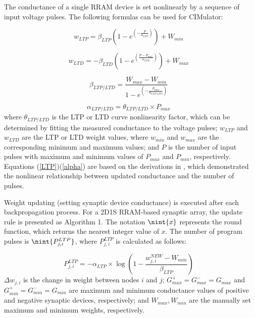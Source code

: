 \documentclass[journal]{IEEEtran}
\DeclarePairedDelimiter{\nint}\lfloor\rceil
\begin{document}
The conductance of a single RRAM device is set nonlinearly by a sequence of input voltage pulses. The following formulas can be used for  CIMulator:

\begin{equation}
w_{LTP}=\beta_{LTP}(1-e^{(-\frac{P}{\alpha_{LTP}})})+W_{min}
\label{LTP}
\end{equation}

\begin{equation}
w_{LTD}=-\beta_{LTD}(1-e^{(\frac{P-P_{max}}{\alpha_{LTD}})})+W_{max}
\label{LTD}
\end{equation}

\begin{equation}
\beta_{LTP/LTD}=\frac{W_{max}-W_{min}}{1-e^{(-\frac{P_{max}}{\alpha_{LTP/LTD}})}}
\label{beta}
\end{equation}

\begin{equation}
\alpha_{LTP/LTD}=\theta_{LTP/LTD}\times{P_{max}}
\label{alpha}
\end{equation}
where $\theta_{LTP/LTD}$ is the LTP or LTD curve nonlinearity factor, which can be determined by fitting the measured conductance to the voltage pulses; $w_{LTP}$ and $w_{LTD}$ are the LTP or LTD weight values, where $w_{min}$ and $w_{max}$ are the corresponding minimum and maximum values; and $P$ is the number of input pulses with maximum and minimum values of $P_{max}$ and $P_{min}$, respectively. Equations (\ref{LTP})\textendash(\ref{alpha}) are based on the derivations in \cite{NeuroSim2}, which demonstrated the nonlinear relationship between updated conductance and the number of pulses.


Weight updating (setting synaptic device conductance) is executed after each backpropagation process. For a 2D1S RRAM-based synaptic array, the update rule is presented as Algorithm 1. The notation $\nint{x}$ represents the round function, which returns the nearest integer value of $x$. The number of program pulses is $\nint{P^{LTP}_{j,i}}$, where $P^{LTP}_{j,i}$ is calculated as follows:

\begin{equation}
P^{LTP}_{j,i} = -\alpha_{LTP} \times \log\left(1- \frac{w^{NEW}_{j,i}-W_{min}}{\beta_{LTP}} \right)
\label{P_LTP}
\end{equation}
$\Delta w_{j,i}$ is the change in weight between nodes $i$ and $j$; $G^+_{max}=G^-_{max}=G_{max}$ and $G^+_{min}=G^-_{min}=G_{min}$ are maximum and minimum conductance values of positive and negative synaptic devices, respectively; and $W_{max}, W_{min}$ are the manually set maximum and minimum weights, respectively.
\end{document}
